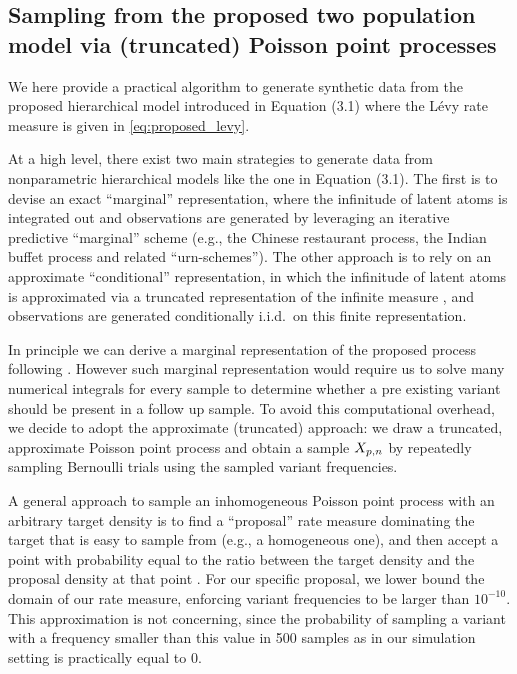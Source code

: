 
\subsection{Sampling from the proposed two population model via (truncated) Poisson point processes}
\label{app:sample_from_pois}

We here provide a practical algorithm to generate synthetic data from the proposed hierarchical model introduced in Equation (3.1) where the L\'{e}vy rate measure is given in \cref{eq:proposed_levy}.

At a high level, there exist two main strategies to generate data from nonparametric hierarchical models like the one in Equation (3.1). The first is to devise an exact ``marginal'' representation, where the infinitude of latent atoms is integrated out and observations are generated by leveraging an iterative predictive ``marginal'' scheme (e.g., the Chinese restaurant process, the Indian buffet process and related ``urn-schemes''). The other approach is to rely on an approximate ``conditional'' representation, in which the infinitude of latent atoms is approximated via a truncated representation of the infinite measure \citep{campbell2019truncated}, and observations are generated conditionally i.i.d.\ on this finite representation.

In principle we can derive a marginal representation of the proposed process following \citet{Broderick2018}. However such marginal representation would require us to solve many numerical integrals for every sample to determine whether a pre existing variant should be present in a follow up sample. 
To avoid this computational overhead, we decide to adopt the approximate (truncated) approach: we draw a truncated, approximate Poisson point process and obtain a sample $X_{p, n}$ by repeatedly sampling Bernoulli trials using the sampled variant frequencies. 


A general approach to sample an inhomogeneous Poisson point process with an arbitrary target density is to find a ``proposal'' rate measure dominating the target that is easy to sample from (e.g., a homogeneous one), and then accept a point with probability equal to the ratio between the target density and the proposal density at that point \citep{saltzman2012simulating}. 
For our specific proposal, we lower bound the domain of our rate measure, enforcing variant frequencies to be larger than $10^{-10}$. This approximation is not concerning, since the probability of sampling a variant with a frequency smaller than this value in 500 samples as in our simulation setting is practically equal to $0$.

